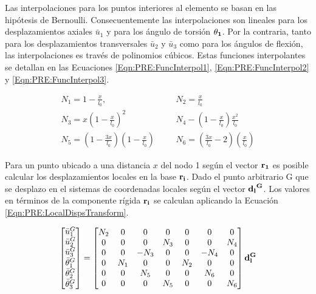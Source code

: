 Las interpolaciones para los puntos interiores al elemento se basan en las hipótesis de Bernoulli. Consecuentemente las interpolaciones son lineales para los desplazamientos axiales $\bar{u}_1$ y para los ángulo de torsión $\bf{\theta_1}$. Por la contraria, tanto para los desplazamientos transversales $\bar{u}_2$ y $\bar{u}_3$  como para los ángulos de flexión, las interpolaciones es través de polinomios cúbicos. Estas funciones interpolantes se detallan en las Ecuaciones \eqref{Eqn:PRE:FuncInterpol1}, \ref{Eqn:PRE:FuncInterpol2} y \eqref{Eqn:PRE:FuncInterpol3}.

\begin{eqnarray}
		\label{Eqn:PRE:FuncInterpol1}
 		N_1 = 1 - \frac{x}{l_0},   		&~~~~& 	N_2= \frac{x}{l_0}\\
 		\label{Eqn:PRE:FuncInterpol2}
 		N_3 = x\left(1 - \frac{x}{l_0}\right)^2 	&~~~~&  N_4 - \left( 1 - \frac{x}{l_0} \right ) \frac{x^2}{l_0} \\
 		\label{Eqn:PRE:FuncInterpol3}
 		N_5 = \left(1 - \frac{3x}{l_0}\right) \left(1 - \frac{x}{l_0}\right) 	&~~~~&  N_6 =\left( \frac{3x}{l_0}-2\right) \left(\frac{x}{l_0}\right)
\end{eqnarray}

Para un punto ubicado a una distancia $x$ del nodo 1 según el vector $\bf{r_1}$ es posible calcular los desplazamientos locales en la base $\bf{r_i}$. Dado el punto arbitrario G que se desplazo en el sistemas de coordenadas locales según el vector $\bf{d_l}^G$. Los valores en términos de la componente rígida $\bf{r_i}$ se calculan aplicando la Ecuación \ref{Eqn:PRE:LocalDispsTransform}.

\begin{equation}\label{Eqn:PRE:LocalDispsTransform}
	\begin{bmatrix}
		\bar{u}_1^G\\
		\bar{u}_2^G\\
		\bar{u}_3^G\\
		 \bar{\theta}_1^G\\
		 \bar{\theta}_2^G\\
		 \bar{\theta}_3^G\\
	\end{bmatrix}
=
\begin{bmatrix}
	N_2 &0  & 0 & 0 & 0 & 0 & 0   \\ 
	0 & 0 & 0 & N_3 & 0 &0  &N_4  \\ 
	0& 0 &-N_3  & 0 &0  & -N_4 &0 \\ 
	0 & N_1 & 0 & 0 &N_2  & 0 &0   \\ 
	0&0  & N_5 & 0 & 0 & N_6 &0   \\ 
	0 & 0 & 0 & N_5 & 0 & 0 & N_6   \\
\end{bmatrix} \bf{d_l^G}
\end{equation}

